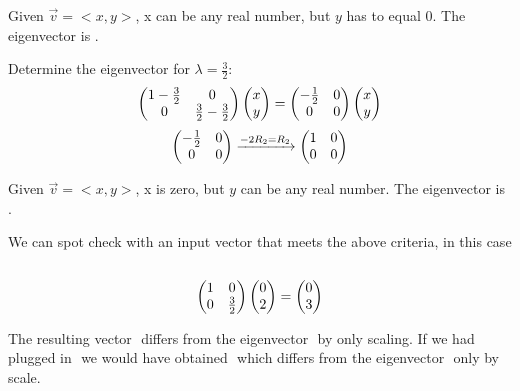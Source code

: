 \documentclass{article}
\begin{document}
\par\noindent Given \(\vec v = <x,y>\), x can be any real number, but \(y\) has to equal 0. The eigenvector is \(<1,0>\). 
\newline
\par\noindent Determine the eigenvector for \(\lambda = \frac{3}{2}\):
\[ 
\left(\begin{array}{@{}cc@{}}
	1 - \frac{3}{2} & 0 \\
	0 & \frac{3}{2} - \frac{3}{2} \\
\end{array}\right) 
\left(\begin{array}{@{}c@{}}
	x \\
	y \\
\end{array}\right) 
=  
\left(\begin{array}{@{}cc@{}}
	-\frac{1}{2} & 0 \\
	0 & 0\\
\end{array}\right) 
\left(\begin{array}{@{}c@{}}
	x \\
	y \\
\end{array}\right) 
\]
\[
\left(\begin{array}{@{}cc@{}}
	-\frac{1}{2} & 0 \\
	0 & 0\\
\end{array}\right) \xrightarrow[]{-2R_2 = R_2} 
\left(\begin{array}{@{}cc@{}}
	1 & 0 \\
	0 & 0\\
\end{array}\right)
\]
\par\noindent Given \(\vec v = <x,y>\), x is zero, but \(y\) can be any real number. The eigenvector is \(<0,1>\).
\newline
\newline
\newline
\begin{minipage}[c]{.5\linewidth}
	\par \noindent We can spot check with an input vector that meets the above criteria, in this case \(<0,2>\) 
	\[ 
	\left(\begin{array}{@{}cc@{}}
		1 &  0 \\
		0 & \frac{3}{2}\\
	\end{array}\right) 
	\left(\begin{array}{@{}c@{}}
		0 \\
		2 \\
	\end{array}\right) 
	=   
	\left(\begin{array}{@{}c@{}}
		0 \\
		3 \\
	\end{array}\right) 
	\]
	\par \noindent The resulting vector \(<0,3>\) differs from the eigenvector \(<0,1>\) by only scaling. If we had plugged in \(<2,0>\) we would have obtained \(<2,0>\) which differs from the eigenvector \(<1,0>\) only by  scale.
\end{minipage}
\end{document}
